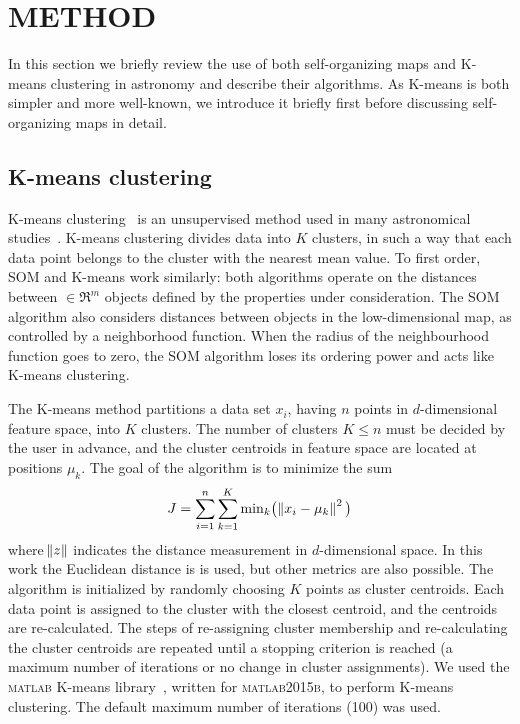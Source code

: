 
\section{METHOD}
\label{sec: method_somz}

In this section we  briefly review the use of both self-organizing maps and K-means clustering in astronomy and describe their algorithms. 
As K-means is both simpler and more well-known, we introduce it briefly first before discussing self-organizing maps in detail. 

\subsection{K-means clustering}
\label{sec: kmeans_method}


K-means clustering~\citep{Macqueen67} is an unsupervised method used in many astronomical studies~\citep[e.g.][]{DAbrusco12,Ordov14,Boersma14,Aycha16}.
K-means clustering divides data into $K$ clusters, in such a way that each data point belongs to the cluster with the nearest mean value.
To first order, SOM and K-means work similarly: both algorithms operate on the distances between  $\in \Re^m$ objects defined by the properties under consideration.
The SOM algorithm also considers distances between objects in the low-dimensional map, as controlled by a neighborhood function. 
When the radius of the neighbourhood function goes to zero, the SOM algorithm loses its ordering power and acts like K-means clustering.



The K-means method partitions a data set $x_i$, having $n$ points in $d$-dimensional feature space, into $K$ clusters.
The number of clusters $K\leq n$ must be decided by the user in advance, and the cluster centroids in feature space are located at positions $\mu_k$.
The goal of the algorithm is to minimize the sum
\begin{equation}
\label{eq:km_sos}
J = \sum_{i=1}^n \sum_{k=1}^K {\min}_k \big( \norm{x_i - \mu_k}^2 \big)
\end{equation}
where $\norm{z}$ indicates the distance measurement in $d$-dimensional space. In this work the Euclidean distance is is used, but other metrics are also possible.
The algorithm is initialized by randomly choosing $K$ points as cluster centroids.
Each data point is assigned to the cluster with the closest centroid, and the centroids are re-calculated.
The steps of re-assigning cluster membership and re-calculating the cluster centroids are repeated until a stopping criterion is reached (a maximum number of iterations or no change in cluster assignments).
We used the \textsc{matlab} K-means library~\citep{Seber84, Spath85}, written for \textsc{matlab2015b}, to perform  K-means clustering.
The default maximum number of iterations (100) was used.



